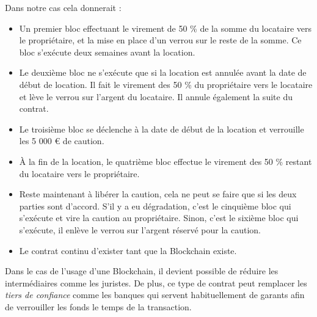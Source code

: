 \documentclass{article}
\begin{document}
\vspace{1em}

Dans notre cas cela donnerait :
\begin{itemize}
    \item Un premier bloc effectuant le virement de 50 \% de la somme du locataire vers le propriétaire, et la mise en place d'un verrou sur le reste de la somme. Ce bloc s'exécute deux semaines avant la location.
    \item Le deuxième bloc ne s'exécute que si la location est annulée avant la date de début de location. Il fait le virement des 50 \% du propriétaire vers le locataire et lève le verrou sur l'argent du locataire. Il annule également la suite du contrat.
    \item Le troisième bloc se déclenche à la date de début de la location et verrouille les 5 000 € de caution.
    \item À la fin de la location, le quatrième bloc effectue le virement des 50 \% restant du locataire vers le propriétaire.
    \item Reste maintenant à libérer la caution, cela ne peut se faire que si les deux parties sont d'accord. S’il y a eu dégradation, c'est le cinquième bloc qui s'exécute et vire la caution au propriétaire. Sinon, c'est le sixième bloc qui s'exécute, il enlève le verrou sur l'argent réservé pour la caution.
    \item Le contrat continu d'exister tant que la Blockchain existe. 
\end{itemize}

\vspace{1em}

Dans le cas de l'usage d'une Blockchain, il devient possible de réduire les intermédiaires comme les juristes. De plus, ce type de contrat peut remplacer les \textit{tiers de confiance} comme les banques qui servent habituellement de garants afin de verrouiller les fonds le temps de la transaction.



\end{document}
